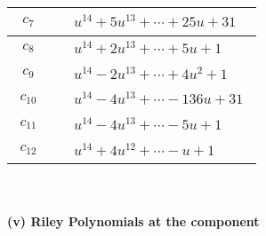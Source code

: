 \documentclass[1p]{elsarticle_modified}
\theoremstyle{definition}
\begin{document}
\begin{tabular}{m{50pt}|m{274pt}}
\hline $$\begin{aligned}c_{7}\end{aligned}$$&$\begin{aligned}
&u^{14}+5 u^{13}+\cdots+25 u+31
\end{aligned}$\\
\hline $$\begin{aligned}c_{8}\end{aligned}$$&$\begin{aligned}
&u^{14}+2 u^{13}+\cdots+5 u+1
\end{aligned}$\\
\hline $$\begin{aligned}c_{9}\end{aligned}$$&$\begin{aligned}
&u^{14}-2 u^{13}+\cdots+4 u^2+1
\end{aligned}$\\
\hline $$\begin{aligned}c_{10}\end{aligned}$$&$\begin{aligned}
&u^{14}-4 u^{13}+\cdots-136 u+31
\end{aligned}$\\
\hline $$\begin{aligned}c_{11}\end{aligned}$$&$\begin{aligned}
&u^{14}-4 u^{13}+\cdots-5 u+1
\end{aligned}$\\
\hline $$\begin{aligned}c_{12}\end{aligned}$$&$\begin{aligned}
&u^{14}+4 u^{12}+\cdots- u+1
\end{aligned}$\\
\hline
\end{tabular}\\~\\
\newpage\renewcommand{\arraystretch}{1}
\flushleft \textbf{(v) Riley Polynomials at the component}\newline \\
\end{document}

